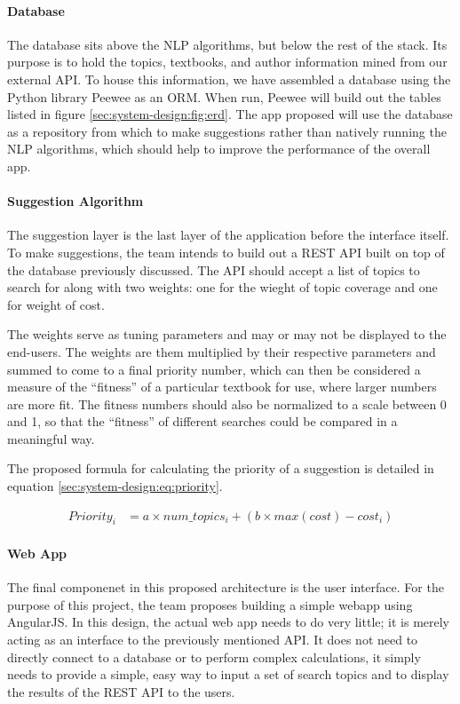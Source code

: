 \paragraph{Database}
The database sits above the NLP algorithms, but below the rest of the
stack.
Its purpose is to hold the topics, textbooks, and author information
mined from our external API.  
To house this information, we have assembled a database using the
Python library Peewee as an ORM.
When run, Peewee will build out the tables listed in figure \ref{sec:system-design:fig:erd}.
The app proposed will use the database as a repository from which to
make suggestions rather than natively running the NLP algorithms,
which should help to improve the performance of the overall app.


\paragraph{Suggestion Algorithm}
The suggestion layer is the last layer of the application before the
interface itself.
To make suggestions, the team intends to build out a REST API built on
top of the database previously discussed.
The API should accept a list of topics to search for along with two
weights: one for the wieght of topic coverage and one for weight of
cost.

The weights serve as tuning parameters and may or may not be displayed
to the end-users.
The weights are them multiplied by their respective parameters and
summed to come to a final priority number, which can then be
considered a measure of the ``fitness'' of a particular textbook for
use, where larger numbers are more fit.
The fitness numbers should also be normalized to a scale between 0 and
1, so that the ``fitness'' of different searches could be compared in
a meaningful way.

The proposed formula for calculating the priority of a suggestion is
detailed in equation \ref{sec:system-design:eq:priority}.


\begin{align}
Priority_i &= a \times num\_topics_i + (b \times max(cost) - cost_i) \label{sec:system-design:eq:priority}
\end{align}

\paragraph{Web App}
The final componenet in this proposed architecture is the user
interface.
For the purpose of this project, the team proposes building a simple
webapp using AngularJS.
In this design, the actual web app needs to do very little; it is
merely acting as an interface to the previously mentioned API.
It does not need to directly connect to a database or to perform
complex calculations, it simply needs to provide a simple, easy way to
input a set of search topics and to display the results of the REST
API to the users.

